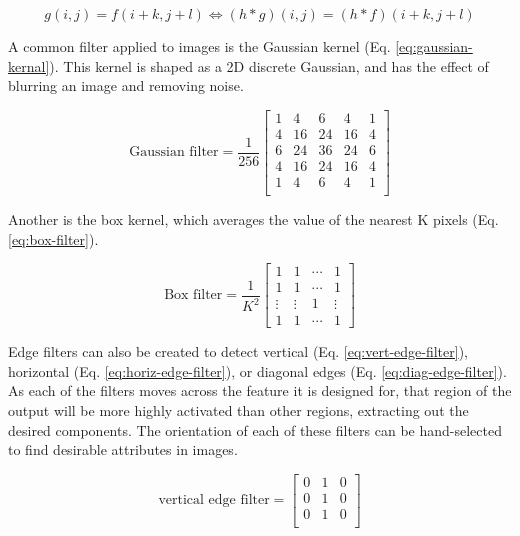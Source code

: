 \begin{equation}
    g(i,j) = f(i+k,j+l) \Longleftrightarrow (h*g)(i,j) = (h*f)(i+k,j+l)
    \label{eq:shift-invariance}
\end{equation}

A common filter applied to images is the Gaussian kernel (Eq. \ref{eq:gaussian-kernal}). This kernel is shaped as a 2D discrete Gaussian, and has the effect of blurring an image and removing noise.

\begin{equation}
    \text{Gaussian filter}=\frac{1}{256}\begin{bmatrix}
        1 & 4 & 6 & 4 & 1 \\
        4 & 16 & 24 & 16 & 4\\
        6 & 24 & 36 & 24 & 6\\
        4 & 16 & 24 & 16 & 4\\
        1 & 4 & 6 & 4 & 1 \\
    \end{bmatrix}
    \label{eq:gaussian-kernal}
\end{equation}

Another is the box kernel, which averages the value of the nearest K pixels (Eq. \ref{eq:box-filter}).

\begin{equation}
    \text{Box filter} = \frac{1}{K^{2}}\begin{bmatrix}
        1 & 1 & \cdots &1\\
        1 & 1 & \cdots &1 \\
        \vdots & \vdots & 1 & \vdots \\
        1 & 1 & \cdots & 1
    \end{bmatrix}
    \label{eq:box-filter}
\end{equation}

Edge filters can also be created to detect vertical (Eq. \ref{eq:vert-edge-filter}), horizontal (Eq. \ref{eq:horiz-edge-filter}), or diagonal edges (Eq. \ref{eq:diag-edge-filter}). As each of the filters moves across the feature it is designed for, that region of the output will be more highly activated than other regions, extracting out the desired components. The orientation of each of these filters can be hand-selected to find desirable attributes in images.

\begin{equation}
    \text{vertical edge filter} = \begin{bmatrix}
            0 & 1 & 0 \\
            0 & 1 & 0 \\
            0 & 1 & 0 \\
    \end{bmatrix}
    \label{eq:vert-edge-filter}
\end{equation}

